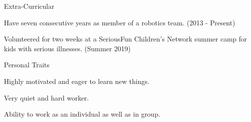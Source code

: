 \documentclass{resume} %
\begin{document}
\begin{rSection}{Extra-Curricular} \itemsep -3pt
\item Have seven consecutive years as member of a robotics team. (2013 - Present)
\item Volunteered for two weeks at a SeriousFun Children's Network summer camp for kids 
	with serious illnesses. (Summer 2019)
\end{rSection}

\begin{rSection}{Personal Traits}
\item Highly motivated and eager to learn new things.
\item Very quiet and hard worker.
\item Ability to work as an individual as well as in group.
\end{rSection}
\end{document}
